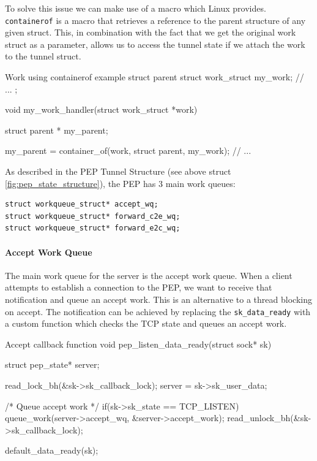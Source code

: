 \documentclass[a4paper,english, 11pt]{report}
\begin{document}
To solve this issue we can make use of a macro which Linux provides. \verb|containerof| is a macro that retrieves a reference to the parent structure of any given struct. This, in combination with the fact that we get the original work struct as a parameter, allows us to access the tunnel state if we attach the work to the tunnel struct.\\

\begin{autonumlstlisting}[label=lst:work_containerof]{Work using containerof example}
struct parent {
    struct work_struct my_work;
    // ...
};

void my_work_handler(struct work_struct *work)
{
   struct parent * my_parent;

   my_parent = container_of(work, struct parent,  my_work);
   // ...
}
\end{autonumlstlisting}

As described in the PEP Tunnel Structure (see above struct \ref{fig:pep_state_structure}), the PEP has 3 main work queues:
\begin{verbatim}
struct workqueue_struct* accept_wq;
struct workqueue_struct* forward_c2e_wq;
struct workqueue_struct* forward_e2c_wq;
\end{verbatim}

\paragraph{Accept Work Queue}
The main work queue for the server is the accept work queue. When a client attempts to establish a connection to the PEP, we want to receive that notification and queue an accept work. This is an alternative to a thread blocking on accept. The notification can be achieved by replacing the \verb|sk_data_ready| with a custom function which checks the TCP state and queues an accept work.\\

\begin{autonumlstlisting}[label=lst:pep_accept_callback]{Accept callback function}
void pep_listen_data_ready(struct sock* sk)
{
	struct pep_state* server;

	read_lock_bh(&sk->sk_callback_lock);
	server = sk->sk_user_data;

	/* Queue accept work */
	if(sk->sk_state == TCP_LISTEN){
		queue_work(server->accept_wq, &server->accept_work);
	}
	read_unlock_bh(&sk->sk_callback_lock);

	default_data_ready(sk);
}
\end{autonumlstlisting}
\end{document}
